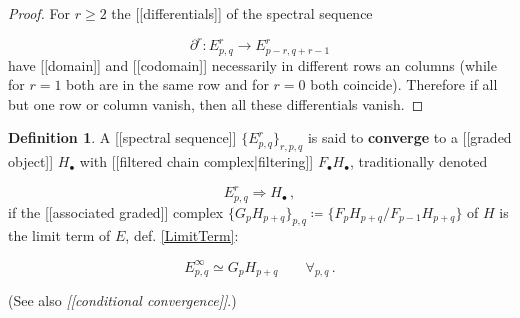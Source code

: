 \documentclass[12pt,titlepage]{article}
\theoremstyle{plain}
\theoremstyle{definition}
\newtheorem{defn}{Definition}
\theoremstyle{remark}
\begin{document}
\begin{proof}
For $r \geq 2$ the [[differentials]] of the spectral sequence

\begin{displaymath}
\partial^r \colon E^r_{p,q} \to E^r_{p-r, q+r-1}
\end{displaymath}
have [[domain]] and [[codomain]] necessarily in different rows an columns (while for $r = 1$ both are in the same row and for $r = 0$ both coincide). Therefore if all but one row or column vanish, then all these differentials vanish.

\end{proof}
\begin{defn}
\label{Convergence}\hypertarget{Convergence}{}
A [[spectral sequence]] $\{E^r_{p,q}\}_{r,p,q}$ is said to \textbf{converge} to a [[graded object]] $H_\bullet$ with [[filtered chain complex|filtering]] $F_\bullet H_\bullet$, traditionally denoted

\begin{displaymath}
E^r_{p,q} \Rightarrow H_\bullet
  \,,
\end{displaymath}
if the [[associated graded]] complex $\{G_p H_{p+q}\}_{p,q} \coloneqq \{F_p H_{p+q} / F_{p-1} H_{p+q}\}$ of $H$ is the limit term of $E$, def. \ref{LimitTerm}:

\begin{displaymath}
E^\infty_{p,q} \simeq G_p H_{p+q} \;\;\;\;\;\;\; \forall_{p,q}
  \,.
\end{displaymath}
\end{defn}
(See also \emph{[[conditional convergence]]}.)
\end{document}
